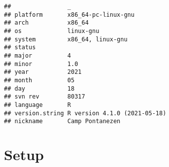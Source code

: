 \documentclass[]{book}
\begin{document}
\begin{verbatim}
##                _                           
## platform       x86_64-pc-linux-gnu         
## arch           x86_64                      
## os             linux-gnu                   
## system         x86_64, linux-gnu           
## status                                     
## major          4                           
## minor          1.0                         
## year           2021                        
## month          05                          
## day            18                          
## svn rev        80317                       
## language       R                           
## version.string R version 4.1.0 (2021-05-18)
## nickname       Camp Pontanezen
\end{verbatim}

\hypertarget{setup-7}{%
\section{Setup}\label{setup-7}}
\end{document}
